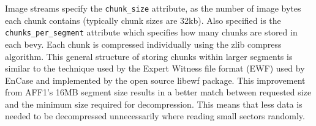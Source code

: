 \documentclass[10pt, conference]{IEEEtran}
\begin{document}
{{Image streams specify the \texttt{chunk\_size} attribute, as the
number of image bytes each chunk contains (typically chunk sizes are
32kb). Also specified is the \texttt{chunks\_per\_segment} attribute
which specifies how many chunks are stored in each bevy. Each chunk is
compressed individually using the zlib compress algorithm. This
general structure of storing chunks within larger segments is similar
to the technique used by the Expert Witness file format (EWF) used by
EnCase\cite{encase-3.0} and implemented by the open source
libewf\cite{libewf} package. This improvement from AFF1's 16MB segment
size results in a better match between requested size and the minimum
size required for decompression. This means that less data is needed
to be decompressed unnecessarily where reading small sectors randomly.





}}
\end{document}

